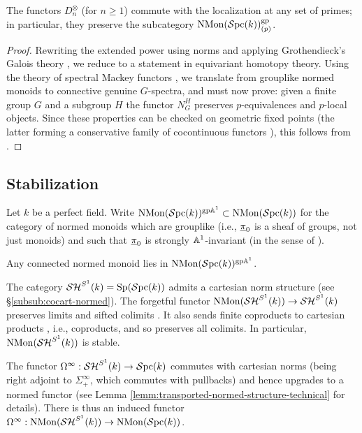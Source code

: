 \documentclass{amsart}
\numberwithin{proposition}{section}
\numberwithin{equation}{section}
\def\NMon{\mathrm{NMon}}
\newcommand{\Sp}{\mathrm{Sp}}
\begin{document}
\begin{lemma} \label{lemm:Dnotimes-plocal}
The functors $D_n^\otimes$ (for $n \ge 1$) commute with the localization at any set of primes; in particular, they preserve the subcategory $\NMon(\Spc(k))_{(p)}^{\gp}$.
\end{lemma}
\begin{proof}
Rewriting the extended power using norms and applying Grothendieck's Galois theory \cite[\S10.2]{bachmann-norms}, we reduce to a statement in equivariant homotopy theory.
Using the theory of spectral Mackey functors \cite[Corollary~A.4.1]{nardin2016stability}, we translate from grouplike normed monoids to connective genuine $G$-spectra, and must now prove: given a finite group $G$ and a subgroup $H$ the functor $N^H_G$ preserves $p$-equivalences and $p$-local objects.
Since these properties can be checked on geometric fixed points (the latter forming a conservative family of cocontinuous functors \cite[Proposition~2.52]{HHR}), this follows from \cite[Proposition~2.57]{HHR}.
\end{proof}

\subsection{Stabilization}
Let $k$ be a perfect field.
Write $\NMon(\Spc(k))^{\gp\A^1} \subset \NMon(\Spc(k))$ for the category of normed monoids which are grouplike (i.e., $\underline\pi_0$ is a sheaf of groups, not just monoids) and such that $\underline\pi_0$ is strongly $\mathbb A^1$-invariant (in the sense of \cite{A1-alg-top}).

\begin{example} \label{ex:connected-gpa1}
Any connected normed monoid lies in $\NMon(\Spc(k))^{\gp\A^1}$.
\end{example}

The category $\SH^{S^1}(k) = \Sp(\Spc(k))$ admits a cartesian norm structure (see \S\ref{subsub:cocart-normed}).
The forgetful functor $\NMon(\SH^{S^1}(k)) \to \SH^{S^1}(k)$ preserves limits and sifted colimits \cite[Proposition~7.6(2) and Remark~7.7]{bachmann-norms}.
It also sends finite coproducts to cartesian products \cite[Remark~7.7]{bachmann-norms} \cite[Proposition~3.2.4.7]{lurie-ha}, i.e., coproducts, and so preserves all colimits.
In particular, $\NMon(\SH^{S^1}(k))$ is stable.

The functor $\Omega^\infty: \mathcal{SH}^{S^1}(k) \to \mathcal{S}\mathrm{pc}{}(k)$ commutes with cartesian norms (being right adjoint to $\Sigma^\infty_+$, which commutes with pullbacks) and hence upgrades to a normed functor (see Lemma \ref{lemm:transported-normed-structure-technical} for details).
There is thus an induced functor $\Omega^\infty: \NMon(\SH^{S^1}(k)) \to \NMon(\Spc(k))$.
\end{document}
